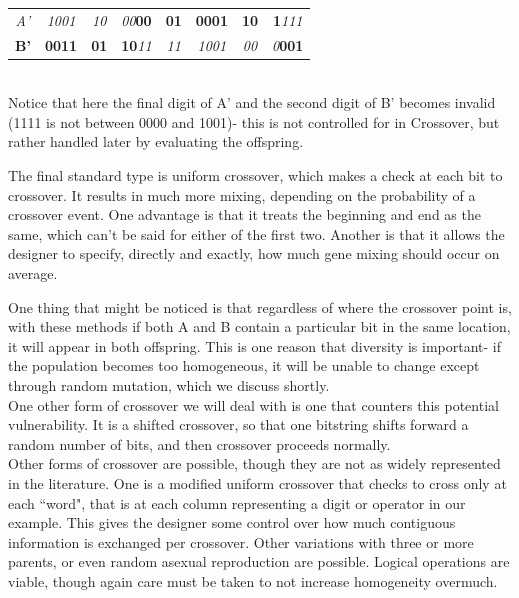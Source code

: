\begin{tabular}{|c|c|c|c|c|c|c|c|}
	\hline
	\textit{A'} & \textit{1001} & \textit{10} & \textit{00}\textbf{00}  & \textbf{01} & \textbf{0001} & \textbf{10} & \textbf{1}\textit{111}\\ 
	\textbf{B'} & \textbf{0011} & \textbf{01} & \textbf{10}\textit{11} & \textit{11} & \textit{1001} & \textit{00} & \textit{0}\textbf{001}\\
	\hline
\end{tabular}\\

Notice that here the final digit of A' and the second digit of B' becomes invalid (1111 is not between 0000 and 1001)- this is not controlled for in Crossover, but rather handled later by evaluating the offspring.

The final standard type is uniform crossover, which makes a check at each bit to crossover.  It results in much more mixing, depending on the probability of a crossover event.  One advantage is that it treats the beginning and end as the same, which can't be said for either of the first two.  Another is that it allows the designer to specify, directly and exactly, how much gene mixing should occur on average.

One thing that might be noticed is that regardless of where the crossover point is, with these methods if both A and B contain a particular bit in the same location, it will appear in both offspring.  This is one reason that diversity is important- if the population becomes too homogeneous, it will be unable to change except through random mutation, which we discuss shortly.\\
One other form of crossover we will deal with is one that counters this potential vulnerability.  It is a shifted crossover, so that one bitstring shifts forward a random number of bits, and then crossover proceeds normally.
\\
Other forms of crossover are possible, though they are not as widely represented in the literature.  One is a modified uniform crossover that checks to cross only  at each ``word", that is at each column representing a digit or operator in our example.  This gives the designer some control over how much contiguous information is exchanged per crossover.  Other variations with three or more parents, or even random asexual reproduction are possible.  Logical operations are viable, though again care must be taken to not increase homogeneity overmuch. \\


